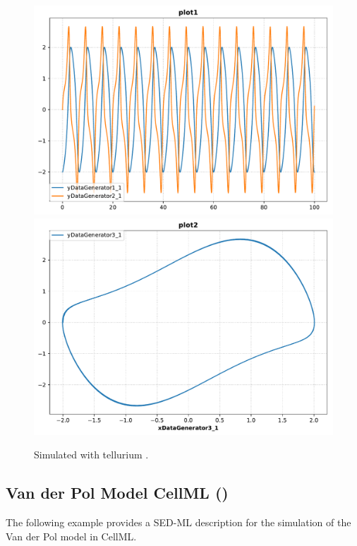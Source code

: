 \begin{figure}[ht]
\begin{minipage}{0.47\textwidth}
        \includegraphics[width=1.0\textwidth]{examples/vanderpol-sbml/results/tellurium/plot1}
        \includegraphics[width=1.0\textwidth]{examples/vanderpol-sbml/results/tellurium/plot2}
        \caption{Simulated with tellurium \citep{tellurium}.}
    \end{minipage}
    \label{fig:lorenz-sbml}
\end{figure}


\subsection{Van der Pol Model CellML ()}
\label{example:vanderpol_cellml}
The following example provides a SED-ML description for the simulation of the Van der Pol model in CellML.

